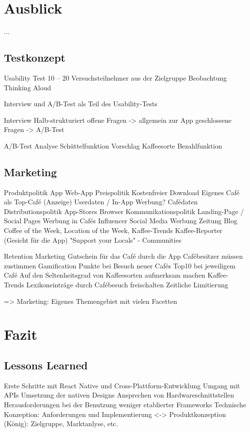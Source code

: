 \chapter{Ausblick}
\label{ausblick}
...


\section{Testkonzept}

Usability Test
10 – 20 Versuchsteilnehmer aus der Zielgruppe
Beobachtung
Thinking Aloud

Interview und A/B-Test als Teil des Usability-Tests


Interview
Halb-strukturiert
offene Fragen -> allgemein zur App
geschlossene Fragen ->   A/B-Test

A/B-Test
Analyse Schüttelfunktion
Vorschlag Kaffeesorte
Bezahlfunktion



\section{Marketing}
Produktpolitik
App
Web-App
Preispolitik
Kostenfreier Download
Eigenes Café als Top-Café (Anzeige)
Userdaten / In-App Werbung?
Cafédaten
Distributionspolitik
App-Stores
Browser
Kommunikationspolitik
Landing-Page / Social Pages
Werbung in Cafés
Influencer
Social Media Werbung
Zeitung
Blog
Coffee of the Week, Location of the Week, Kaffee-Trends
Kaffee-Reporter (Gesicht für die App)
"Support your Locals" - Communities

Retention Marketing
Gutschein für das Café durch die App
Cafébesitzer müssen zustimmen
Gamification
Punkte bei Besuch neuer Cafés
Top10 bei jeweiligem Café
Auf den Seltenheitsgrad von Kaffeesorten aufmerksam machen
Kaffee-Trends
Lexikoneinträge durch Cafébesuch freischalten
Zeitliche Limitierung

=> Marketing: Eigenes Themengebiet mit vielen Facetten






\chapter{Fazit}
\label{fazit}


\section{Lessons Learned}
Erste Schritte mit React Native und Cross-Plattform-Entwicklung
Umgang mit APIs
Umsetzung der nativen Designs
Ansprechen von Hardwareschnittstellen
Herausforderungen bei der Benutzung weniger etablierter Frameworks
Technische Konzeption: Anforderungen und Implementierung <-> Produktkonzeption (König): Zielgruppe, Marktanlyse, etc.




